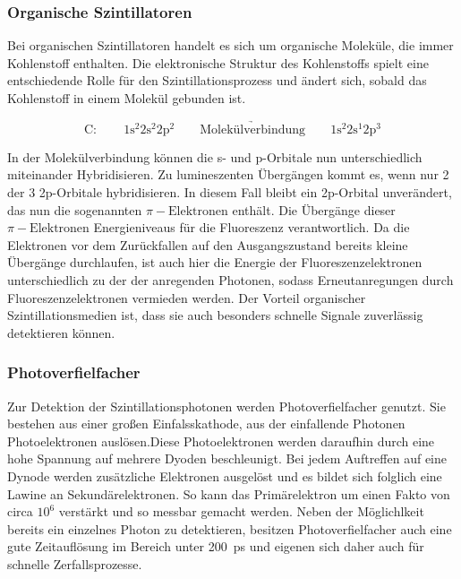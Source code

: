             \subsubsection*{Organische Szintillatoren}
                Bei organischen Szintillatoren handelt es sich um organische Moleküle, die immer Kohlenstoff enthalten. Die elektronische Struktur des Kohlenstoffs spielt eine entschiedende Rolle für den
                Szintillationsprozess und ändert sich, sobald das Kohlenstoff in einem Molekül gebunden ist.

                \begin{equation*}
                    \text{C}: \qquad 1\text{s}^2 2\text{s}^2 2\text{p}^2 \qquad \underrightarrow{\text{Molekülverbindung}} \qquad 1\text{s}^2 2\text{s}^1 2\text{p}^3
                \end{equation*}

                In der Molekülverbindung können die s- und p-Orbitale nun unterschiedlich miteinander Hybridisieren. Zu lumineszenten Übergängen kommt es, wenn nur 2 der 3 2p-Orbitale hybridisieren. In diesem
                Fall bleibt ein 2p-Orbital unverändert, das nun die sogenannten $\pi-\text{Elektronen}$ enthält. Die Übergänge dieser $\pi-\text{Elektronen}$ Energieniveaus für die Fluoreszenz verantwortlich.
                Da die Elektronen vor dem Zurückfallen auf den Ausgangszustand bereits kleine Übergänge durchlaufen, ist auch hier die Energie der Fluoreszenzelektronen unterschiedlich zu der der anregenden
                Photonen, sodass Erneutanregungen durch Fluoreszenzelektronen vermieden werden. Der Vorteil organischer Szintillationsmedien ist, dass sie auch besonders schnelle Signale zuverlässig 
                detektieren können.

            \subsubsection*{Photoverfielfacher}
                Zur Detektion der Szintillationsphotonen werden Photoverfielfacher genutzt. Sie bestehen aus einer großen Einfalsskathode, aus der einfallende Photonen Photoelektronen auslösen.Diese
                Photoelektronen werden daraufhin durch eine hohe Spannung auf mehrere Dyoden beschleunigt. Bei jedem Auftreffen auf eine Dynode werden zusätzliche Elektronen ausgelöst und es bildet sich 
                folglich eine Lawine an Sekundärelektronen. So kann das Primärelektron um einen Fakto von circa $10^6$ verstärkt und so messbar gemacht werden. Neben der Möglichlkeit bereits ein einzelnes 
                Photon zu detektieren, besitzen Photoverfielfacher auch eine gute Zeitauflösung im  Bereich unter \SI{200}{\pico\second} und eigenen sich daher auch für schnelle Zerfallsprozesse.


